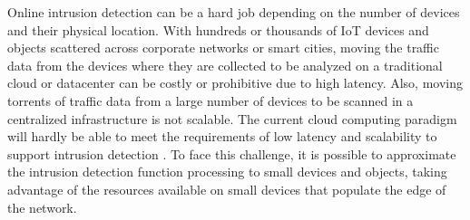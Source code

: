 Online intrusion detection can be a hard job   depending on the number of devices and their physical location.
With hundreds or thousands of IoT devices and objects scattered across corporate networks or smart cities, moving the traffic data from the devices where they are collected to be analyzed on a traditional cloud or datacenter can be costly or prohibitive due to high latency. Also, moving torrents of traffic data from a large number of devices to be scanned in a centralized infrastructure is not scalable. The current cloud computing paradigm will hardly be able to meet the requirements of low latency and scalability to support intrusion detection \cite{dastjerdi2016fog}.
To face this challenge, it is possible to approximate the intrusion detection function processing to small devices and objects, taking advantage of the resources available on small devices that populate the edge of the network.

